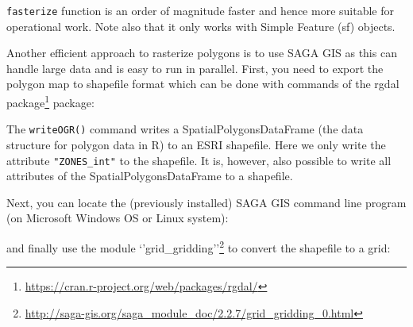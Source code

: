 \documentclass[graybox,natbib,nospthms,UStrade]{svmono}
\newenvironment{Shaded}{\begin{snugshade}}{\end{snugshade}}
\newcommand{\CommentTok}[1]{\textcolor[rgb]{0.37,0.37,0.37}{\textit{#1}}}
\newcommand{\ControlFlowTok}[1]{\textcolor[rgb]{0.27,0.27,0.27}{\textbf{#1}}}
\newcommand{\KeywordTok}[1]{\textcolor[rgb]{0.27,0.27,0.27}{\textbf{#1}}}
\newcommand{\NormalTok}[1]{#1}
\newcommand{\OperatorTok}[1]{\textcolor[rgb]{0.43,0.43,0.43}{\textbf{#1}}}
\newcommand{\StringTok}[1]{\textcolor[rgb]{0.5,0.5,0.5}{#1}}
\renewcommand{\href}[2]{#2 (\url{#1})}
\renewcommand{\href}[2]{#2\footnote{\url{#1}}}
\begin{document}
\texttt{fasterize} function is an order of magnitude faster and hence more suitable for operational work. Note also that it only works with Simple Feature (sf) objects.

Another efficient approach to rasterize polygons is to use SAGA GIS as this can handle large data and is easy to run in parallel. First, you need to export the polygon map to shapefile format which can be done with commands of the \href{https://cran.r-project.org/web/packages/rgdal/}{rgdal package} package:

\begin{Shaded}
\end{Shaded}

The \texttt{writeOGR()} command writes a SpatialPolygonsDataFrame (the data structure for polygon data in R) to an ESRI shapefile. Here we only write the attribute \texttt{"ZONES\_int"} to the shapefile. It is, however, also possible to write all attributes of the SpatialPolygonsDataFrame to a shapefile.

Next, you can locate the (previously installed) SAGA GIS command line program (on Microsoft Windows OS or Linux system):

\begin{Shaded}
\end{Shaded}

and finally use the module \href{http://saga-gis.org/saga_module_doc/2.2.7/grid_gridding_0.html}{`'grid\_gridding''} to convert the shapefile to a grid:
\end{document}
